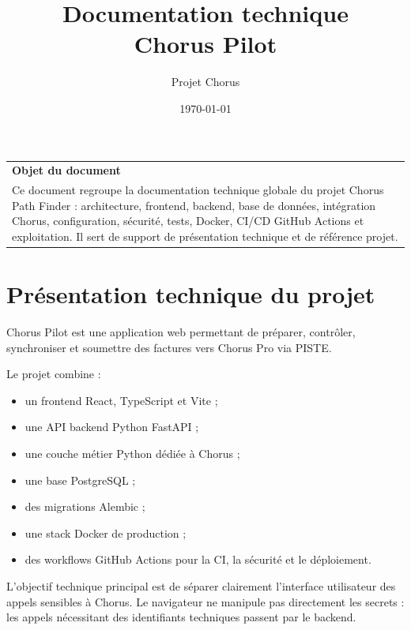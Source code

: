\documentclass[11pt,a4paper]{article}
\title{
  \vspace{-1.5cm}
  \textbf{\Huge Documentation technique}\\
  \vspace{0.3cm}
  \Large Chorus Pilot
}
\author{Projet Chorus}
\date{\today}
\begin{document}
\maketitle
\thispagestyle{empty}

\begin{center}
  \vspace{0.5cm}
  \begin{tabularx}{0.9\textwidth}{|X|}
    \hline
    \textbf{Objet du document} \\
    Ce document regroupe la documentation technique globale du projet Chorus Path
    Finder : architecture, frontend, backend, base de données, intégration Chorus,
    configuration, sécurité, tests, Docker, CI/CD GitHub Actions et exploitation.
    Il sert de support de présentation technique et de référence projet. \\
    \hline
  \end{tabularx}
\end{center}

\newpage
\tableofcontents
\newpage

\section{Présentation technique du projet}

Chorus Pilot est une application web permettant de préparer, contrôler,
synchroniser et soumettre des factures vers Chorus Pro via PISTE.

Le projet combine :

\begin{itemize}
  \item un frontend React, TypeScript et Vite ;
  \item une API backend Python FastAPI ;
  \item une couche métier Python dédiée à Chorus ;
  \item une base PostgreSQL ;
  \item des migrations Alembic ;
  \item une stack Docker de production ;
  \item des workflows GitHub Actions pour la CI, la sécurité et le déploiement.
\end{itemize}

L'objectif technique principal est de séparer clairement l'interface utilisateur
des appels sensibles à Chorus. Le navigateur ne manipule pas directement les
secrets : les appels nécessitant des identifiants techniques passent par le
backend.
\end{document}
